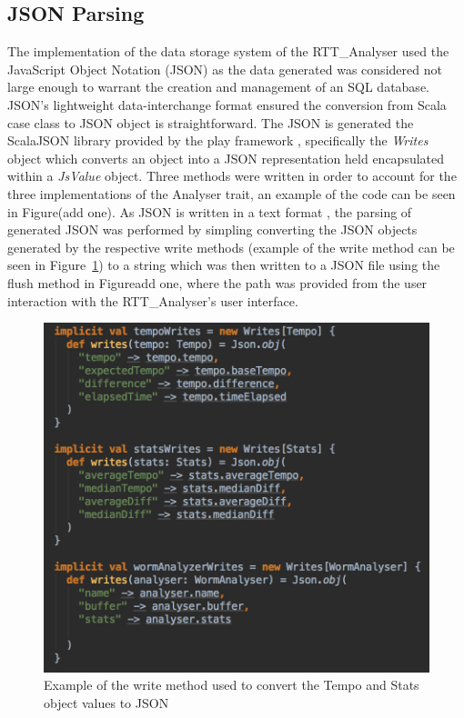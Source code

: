 \documentclass[a4paper, 11pt]{article}
\begin{document}
\subsection{JSON Parsing}

The implementation of the data storage system of the RTT\_Analyser used the JavaScript Object Notation (JSON) as the data generated was considered not large enough to warrant the creation and management of an SQL database. JSON's lightweight data-interchange format \cite{json} ensured the conversion from Scala case class to JSON object is straightforward. The JSON is generated the ScalaJSON library provided by the play framework \cite{play}, specifically the \textit{Writes} object which converts an object into a JSON representation held encapsulated within a \textit{JsValue} object. Three methods were written in order to account for the three implementations of the Analyser trait, an example of the code can be seen in Figure(add one). As JSON is written in a text format \cite{json}, the parsing of generated JSON was performed by simpling converting the JSON objects generated by the respective write methods (example of the write method can be seen in Figure~\ref{fig: json}) to a string which was then written to a JSON file using the flush method in Figure{add one}, where the path was provided from the user interaction with the RTT\_Analyser's user interface.

\begin{figure}[htbp]
\centering
\includegraphics[scale=0.25]{images/writes.jpg}
\caption{Example of the write method used to convert the Tempo and Stats object values to JSON}
\label{fig: json}
\end{figure}
\end{document}
